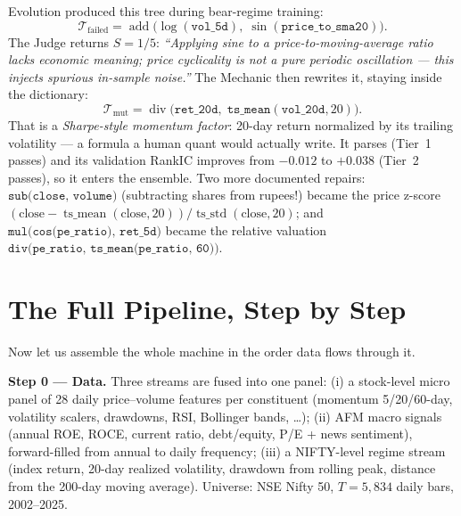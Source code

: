 \documentclass[11pt,a4paper]{article}
\begin{document}
\begin{plaineng}
Evolution produced this tree during bear-regime training:
\[
  \mathcal{T}_{\text{failed}} =
  \operatorname{add}\bigl(\log(\texttt{vol\_5d}),\;
  \sin(\texttt{price\_to\_sma20})\bigr).
\]
The Judge returns $S = 1/5$: \emph{``Applying sine to a price-to-moving-average
ratio lacks economic meaning; price cyclicality is not a pure periodic
oscillation --- this injects spurious in-sample noise.''} The Mechanic then
rewrites it, staying inside the dictionary:
\[
  \mathcal{T}_{\text{mut}} =
  \operatorname{div}\bigl(\texttt{ret\_20d},\;
  \texttt{ts\_mean}(\texttt{vol\_20d}, 20)\bigr).
\]
That is a \emph{Sharpe-style momentum factor}: 20-day return normalized by its
trailing volatility --- a formula a human quant would actually write. It
parses (Tier~1 passes) and its validation RankIC improves from $-0.012$ to
$+0.038$ (Tier~2 passes), so it enters the ensemble. Two more documented
repairs: $\texttt{sub(close, volume)}$ (subtracting shares from rupees!)
became the price z-score $(\text{close}-\operatorname{ts\_mean}(\text{close},20))/\operatorname{ts\_std}(\text{close},20)$;
and $\texttt{mul(cos(pe\_ratio), ret\_5d)}$ became the relative valuation
$\texttt{div(pe\_ratio, ts\_mean(pe\_ratio, 60))}$.
\end{plaineng}

\section{The Full Pipeline, Step by Step}
\label{sec:pipeline}

\begin{plaineng}
Now let us assemble the whole machine in the order data flows through it.
\end{plaineng}

\textbf{Step 0 --- Data.} Three streams are fused into one panel:
(i) a stock-level micro panel of 28 daily price--volume features per
constituent (momentum 5/20/60-day, volatility scalers, drawdowns, RSI,
Bollinger bands, \dots); (ii) AFM macro signals (annual ROE, ROCE, current
ratio, debt/equity, P/E + news sentiment), forward-filled from annual to daily
frequency; (iii) a NIFTY-level regime stream (index return, 20-day realized
volatility, drawdown from rolling peak, distance from the 200-day moving
average). Universe: NSE Nifty 50, $T = 5{,}834$ daily bars, 2002--2025.
\end{document}
